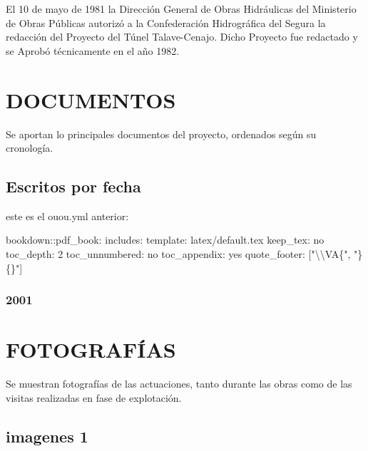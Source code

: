 \documentclass[10pt,spanish,a4paper,oneside]{article}
\newenvironment{Shaded}{\begin{snugshade}}{\end{snugshade}}
\newcommand{\DecValTok}[1]{\textcolor[rgb]{0.06,0.06,0.06}{{#1}}}
\newcommand{\CharTok}[1]{\textcolor[rgb]{0.5,0.5,0.5}{{#1}}}
\newcommand{\StringTok}[1]{\textcolor[rgb]{0.5,0.5,0.5}{{#1}}}
\newcommand{\NormalTok}[1]{{#1}}
\begin{document}
El 10 de mayo de 1981 la Dirección General de Obras Hidráulicas del
Ministerio de Obras Públicas autorizó a la Confederación Hidrográfica
del Segura la redacción del Proyecto del Túnel Talave-Cenajo. Dicho
Proyecto fue redactado y se Aprobó técnicamente en el año 1982.

\section{\texorpdfstring{DOCUMENTOS
\label{doc}}{DOCUMENTOS }}\label{documentos}

Se aportan lo principales documentos del proyecto, ordenados según su
cronología.

\subsection{Escritos por fecha}\label{escritos-por-fecha}

este es el ouou.yml anterior:

\begin{Shaded}
\begin{Highlighting}[]
\NormalTok{bookdown::pdf_book:}
\StringTok{  }\NormalTok{includes:}
\StringTok{    }\NormalTok{template:}\StringTok{ }\NormalTok{latex/default.tex}
  \NormalTok{keep_tex:}\StringTok{ }\NormalTok{no}
  \NormalTok{toc_depth:}\StringTok{ }\DecValTok{2}
  \NormalTok{toc_unnumbered:}\StringTok{ }\NormalTok{no}
  \NormalTok{toc_appendix:}\StringTok{ }\NormalTok{yes}
\NormalTok{quote_footer:}\StringTok{ }\NormalTok{[}\StringTok{"}\CharTok{\textbackslash{}\textbackslash{}}\StringTok{VA\{"}\NormalTok{, }\StringTok{"\}\{\}"}\NormalTok{]}
\end{Highlighting}
\end{Shaded}

\subsubsection{2001}\label{section}

\section{\texorpdfstring{FOTOGRAFÍAS
\label{fotos}}{FOTOGRAFÍAS }}\label{fotografias}

Se muestran fotografías de las actuaciones, tanto durante las obras como
de las visitas realizadas en fase de explotación.

\subsection{imagenes 1}\label{imagenes-1}
\end{document}
